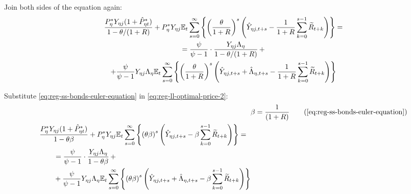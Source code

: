 \documentclass[
thesis.tex
]{subfiles}
\begin{document}
Join both sides of the equation again:
\begin{multline}
	\frac{ P_{\eta}^{\ast} Y_{\eta j} ( 1 + \hat{P}_{\eta t}^{\ast} )}{1-\theta /(1+R)} + P_{\eta}^{\ast} Y_{\eta j} {\mathbb{E}_{t}} \sum_{s=0}^{\infty} \left\{ \left( \frac{\theta}{1 + R} \right)^s \left( \hat{Y}_{\eta j, t+s} - \frac{1}{1 + R} \sum_{k=0}^{s-1} \widetilde{R}_{t+k} \right) \right\} = 
	\\
	= \frac{\psi}{\psi-1} \cdot \frac{Y_{\eta j} \Lambda_{\eta}}{1-\theta /(1+R)} \, + 
	\\
	+ \frac{\psi}{\psi-1} Y_{\eta j} \Lambda_{\eta} {\mathbb{E}_{t}} \sum_{s=0}^{\infty} \left\{ \left( \frac{\theta}{1 + R} \right)^s \left( \hat{Y}_{\eta j, t+s} + \hat{\Lambda}_{\eta, t+s} - \frac{1}{1 + R} \sum_{k=0}^{s-1} \widetilde{R}_{t+k} \right) \right\} \label{eq:reg-ll-optimal-price-2}
\end{multline}

Substitute \ref{eq:reg-ss-bonds-euler-equation} in \ref{eq:reg-ll-optimal-price-2}:
\begin{align}
	& \beta = \frac{1}{(1 + R)} \tag{\ref{eq:reg-ss-bonds-euler-equation}} \\
	\begin{split} & \frac{ P_{\eta}^{\ast} Y_{\eta j} ( 1 + \hat{P}_{\eta t}^{\ast} )}{1- \theta \beta} + P_{\eta}^{\ast} Y_{\eta j} \E \sum_{s=0}^{\infty} \left\{ \left( \theta \beta \right)^s \left( \hat{Y}_{\eta j, t+s} - \beta \sum_{k=0}^{s-1} \widetilde{R}_{t+k} \right) \right\} = \\ & \qquad = \frac{\psi}{\psi-1} \cdot \frac{Y_{\eta j} \Lambda_{\eta}}{1- \theta \beta} \, + \\ & \qquad + \frac{\psi}{\psi-1} Y_{\eta j} \Lambda_{\eta} \E \sum_{s=0}^{\infty} \left\{ \left( \theta \beta \right)^s \left( \hat{Y}_{\eta j, t+s} + \hat{\Lambda}_{\eta, t+s} - \beta \sum_{k=0}^{s-1} \widetilde{R}_{t+k} \right) \right\} \end{split} \label{eq:reg-ll-optimal-price-3}
\end{align}
\end{document}
